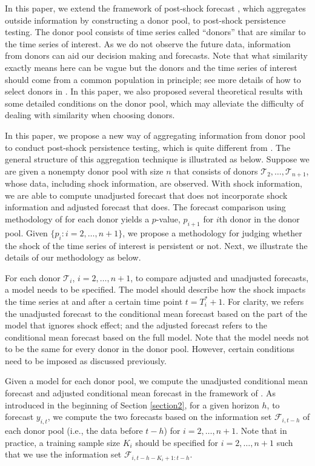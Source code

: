 \documentclass[11pt]{article}
\def\mc#1{\mathcal{#1}} %
\def\mc#1{\mathcal{#1}}
\theoremstyle{definition}
\begin{document}
In this paper, we extend the framework of post-shock forecast \citep{lin2021minimizing}, which aggregates outside information by constructing a donor pool, to post-shock persistence testing. The donor pool consists of time series called  ``donors'' that are similar to the time series of interest. As we do not observe the future data, information from donors can aid our decision making and forecasts. Note that what  similarity exactly means here can be vague but the donors and the time series of interest should come from a common population in principle; see more details of how to select donors in \cite{lin2021minimizing}. In this paper, we also proposed several theoretical results with some detailed conditions on the donor pool, which may alleviate the difficulty of dealing with similarity when choosing donors.


In this paper, we propose a new way of aggregating information from donor pool to conduct post-shock persistence testing, which is quite different from \cite{lin2021minimizing}. The general structure of this aggregation technique is illustrated as below. Suppose we are given a nonempty donor pool with size $n$ that consists of donors $\mc{T}_2, \ldots, \mc{T}_{n+1}$, whose data, including shock information, are observed. With shock information, we are able to compute unadjusted forecast that does not incorporate shock information and adjusted forecast that does.  The forecast comparison using methodology of \cite{quaedvlieg2021multi} for each donor yields a $p$-value, $p_{i+1}$ for $i$th donor in the donor pool. Given $\{p_i \colon i = 2, \ldots, n+1\}$, we propose a methodology for judging whether the shock of the time series of interest is persistent or not. Next, we illustrate the details of our methodology as below.



For each donor $\mc{T}_i$, $i = 2, \ldots, n+1$, to compare adjusted and unadjusted forecasts,  a model needs to be specified. The model should describe how the shock impacts the time series at and after a certain time point $t= T_i^* + 1$. For clarity, we refers the unadjusted forecast to the conditional mean forecast based on the part of the model that ignores shock effect; and the adjusted forecast refers to the conditional mean forecast based on the full model. Note that the model needs not to be the same for every donor in the donor pool. However, certain conditions need to be imposed as discussed previously. 

 Given a model for each donor pool, we compute the unadjusted conditional mean forecast and adjusted conditional mean forecast in the framework of \cite{quaedvlieg2021multi}. As introduced in the beginning of Section \ref{section2}, for a given horizon $h$, to forecast $y_{i, t}$, we compute the two forecasts based on the information set $\mathcal{F}_{i, t-h}$ of each donor pool (i.e., the data before $t-h$) for $i = 2, \ldots, n+1$. Note that in practice, a training sample size $K_i$ should be specified for $i = 2, \ldots, n+1$ such that we use the information set $\mathcal{F}_{i, t-h-K_i + 1:t-h}$. 
 
\end{document}
